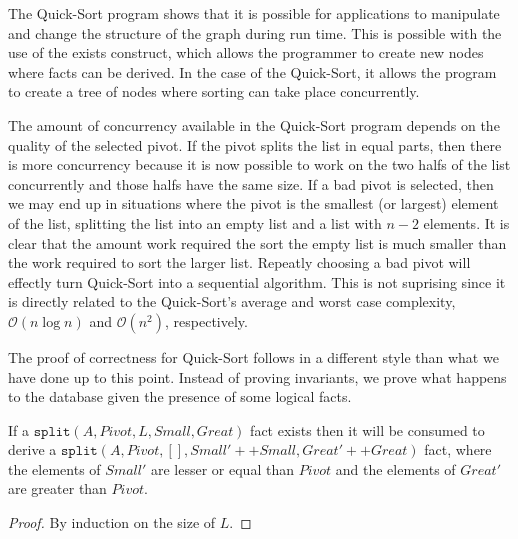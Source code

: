 The Quick-Sort program shows that it is possible for applications to manipulate
and change the structure of the graph during run time. This is possible with the
use of the exists construct, which allows the programmer to create new nodes
where facts can be derived. In the case of the Quick-Sort, it allows the program
to create a tree of nodes where sorting can take place concurrently.

The amount of concurrency available in the Quick-Sort program depends on the
quality of the selected pivot. If the pivot splits the list in equal parts, then
there is more concurrency because it is now possible to work on the two halfs of
the list concurrently and those halfs have the same size. If a bad pivot is
selected, then we may end up in situations where the pivot is the smallest (or
largest) element of the list, splitting the list into an empty list and a list
with $n-2$ elements. It is clear that the amount work required the sort the
empty list is much smaller than the work required to sort the larger list.
Repeatly choosing a bad pivot will effectly turn Quick-Sort into a sequential
algorithm. This is not suprising since it is directly related to the
Quick-Sort's average and worst case complexity, $\mathcal{O}(n \log{n})$ and
$\mathcal{O}(n^2)$, respectively.

The proof of correctness for Quick-Sort follows in a different style than what
we have done up to this point. Instead of proving invariants, we prove what
happens to the database given the presence of some logical facts.

\begin{lemma}

If a $\mathtt{split}(A, Pivot, L, Small, Great)$ fact exists then it will be
consumed to derive a $\mathtt{split}(A, Pivot, [], Small' ++ Small, Great' ++
Great)$ fact, where the elements of $Small'$ are lesser or equal than $Pivot$
and the elements of $Great'$ are greater than $Pivot$.

\end{lemma}
\begin{proof}
By induction on the size of $L$.
\end{proof}


